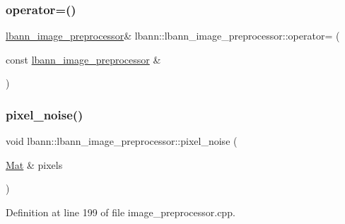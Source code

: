 \mbox{\label{classlbann_1_1lbann__image__preprocessor_af652494123a62e653cd7dc2d7c340219}} 
\subsubsection{\texorpdfstring{operator=()}{operator=()}}
{\footnotesize\ttfamily \hyperlink{classlbann_1_1lbann__image__preprocessor}{lbann\+\_\+image\+\_\+preprocessor}\& lbann\+::lbann\+\_\+image\+\_\+preprocessor\+::operator= (\begin{DoxyParamCaption}\item[{const \hyperlink{classlbann_1_1lbann__image__preprocessor}{lbann\+\_\+image\+\_\+preprocessor} \&}]{ }\end{DoxyParamCaption})\hspace{0.3cm}{\ttfamily [default]}}

\mbox{\label{classlbann_1_1lbann__image__preprocessor_aece5b572d0a2fe123cc66412d7a5c91e}} 
\subsubsection{\texorpdfstring{pixel\+\_\+noise()}{pixel\_noise()}}
{\footnotesize\ttfamily void lbann\+::lbann\+\_\+image\+\_\+preprocessor\+::pixel\+\_\+noise (\begin{DoxyParamCaption}\item[{\hyperlink{base_8hpp_a68f11fdc31b62516cb310831bbe54d73}{Mat} \&}]{pixels }\end{DoxyParamCaption})\hspace{0.3cm}{\ttfamily [protected]}}



Definition at line 199 of file image\+\_\+preprocessor.\+cpp.


